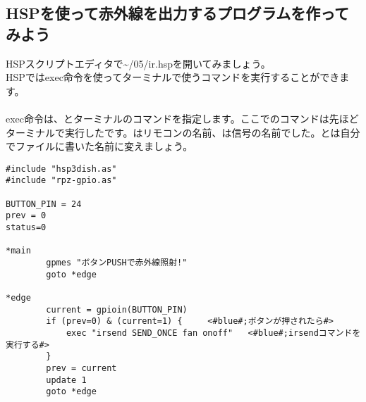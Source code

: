 \subsection{HSPを使って赤外線を出力するプログラムを作ってみよう}
HSPスクリプトエディタで\textasciitilde /05/ir.hspを開いてみましょう。\\
HSPではexec命令を使ってターミナルで使うコマンドを実行することができます。\\
\\
exec命令は、とターミナルのコマンドを指定します。ここでのコマンドは先ほどターミナルで実行したです。\code{\textcolor{red}{fan}}はリモコンの名前、\code{\textcolor{red}{onoff}}は信号の名前でした。\code{\textcolor{red}{fan}}と\code{\textcolor{red}{onoff}}は自分でファイルに書いた名前に変えましょう。\\

\begin{lstlisting}[caption=ir.hsp,label=ir.hsp]
#include "hsp3dish.as"
#include "rpz-gpio.as"

BUTTON_PIN = 24
prev = 0
status=0

*main
        gpmes "ボタンPUSHで赤外線照射!"
        goto *edge

*edge
        current = gpioin(BUTTON_PIN)
        if (prev=0) & (current=1) {		<#blue#;ボタンが押されたら#>
            exec "irsend SEND_ONCE fan onoff"	<#blue#;irsendコマンドを実行する#>
        }
        prev = current
        update 1
        goto *edge
\end{lstlisting}

\begin{tcolorbox}[title=\useOmetoi]
\begin{enumerate}
\end{enumerate}
\end{tcolorbox}